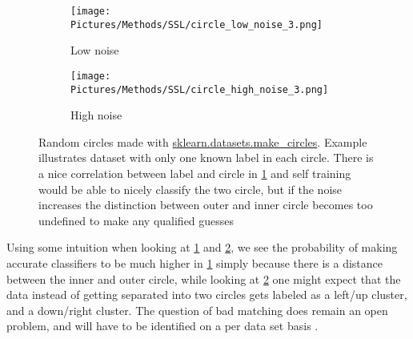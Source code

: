 \documentclass[10pt, letterpaper]{article}
\begin{document}
\begin{figure}[!ht]
    \centering
    \begin{subfigure}[t]{.45\linewidth}
      \centering
      \texttt{[image: Pictures/Methods/SSL/circle\_low\_noise\_3.png]}
      \caption{Low noise}
      \label{fig:meth-lownoise}
    \end{subfigure}
    \hfill
    \begin{subfigure}[t]{.45\linewidth}
      \centering
      \texttt{[image: Pictures/Methods/SSL/circle\_high\_noise\_3.png]}
      \caption{High noise}
      \label{fig:meth-highnoise}
    \end{subfigure}
    \caption{Random circles made with \href{https://scikit-learn.org/stable/modules/generated/sklearn.datasets.make\_circles.html}{sklearn.datasets.make\_circles}. Example illustrates dataset with only one known label in each circle. There is a nice correlation between label and circle in \cref{fig:meth-lownoise} and self training would be able to nicely classify the two circle, but if the noise increases the distinction between outer and inner circle becomes too undefined to make any qualified guesses}
    \label{fig:meth-circles}
\end{figure}

Using some intuition when looking at \cref{fig:meth-lownoise} and \cref{fig:meth-highnoise}, we see the probability of making accurate classifiers to be much higher in \cref{fig:meth-lownoise} simply because there is a distance between the inner and outer circle, while looking at \cref{fig:meth-highnoise} one might expect that the data instead of getting separated into two circles gets labeled as a left/up cluster, and a down/right cluster. The question of bad matching does remain an open problem, and will have to be identified on a per data set basis \cite{zhusurvey}.

\newpage
\nocite{*}
\printbibliography[heading=bibintoc,title={Bibliography}]
\end{document}
